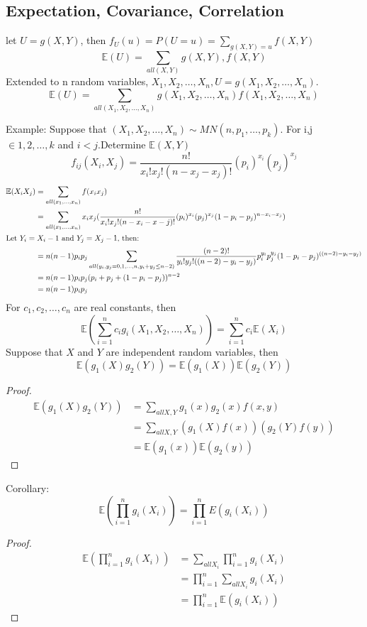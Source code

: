 \documentclass{article}
\newcommand{\E}{\mathbb{E}}
\begin{document}
\subsection{Expectation, Covariance, Correlation}
let $U = g(X,Y)$, then $f_U(u) = P(U = u) = \sum_{g(X,Y) = u} f(X, Y)$
$$\E(U) = \sum_{all(X,Y)}g(X,Y),f(X,Y)$$
Extended to n random variables, $X_1, X_2, \dotsc, X_n, U = g(X_1, X_2, \dotsc, X_n)$.
$$\E(U) = \sum_{all(X_1,X_2, \dotsc, X_n)}g(X_1, X_2, \dotsc, X_n)f(X_1, X_2, \dotsc, X_n)$$

\noindent Example: Suppose that $(X_1, X_2, \dotsc, X_n) \sim MN(n, p_1, \dotsc, p_k)$. For i,j $\in {1, 2, \dotsc, k}$ and $i<j$.Determine $\E(X,Y)$
$$f_{ij}(X_i, X_j) = \frac{n! }{x_i!x_j!(n - x_j - x_j)!} (p_i)^{x_i}(p_j)^{x_j}$$
\begin{align*}
    \E(X_iX_j) &= \sum_{all(x_1, \dotsc, x_n)}f(x_ix_j) \\
    &= \sum_{all (x_1, \dotsc, x_n)}x_ix_j(\frac{n!}{x_i!x_j!(n - x_i - x-j)!}(p_i)^{x_i}(p_j)^{x_j}(1-p_i-p_j)^{n - x_i - x_j}) \\
    \intertext{Let $Y_i = X_i - 1$ and $Y_j = X_j - 1$, then:}
    &= n(n-1)p_ip_j\sum_{all(y_i, y_j = 0, 1, \dotsc, n, y_i+y_j \le n - 2)}\frac{(n-2)!}{y_i!y_j!((n-2) - y_i - y_j)} p_i^{y_i}p_j^{y_j}(1 - p_i - p_j)^{((n-2) - y_i - y_j)}\\
    &= n(n-1)p_ip_j(p_i+p_j+(1-p_i-p_j))^{n-2}\\
    &= n(n-1)p_ip_j\\
\end{align*}
For $c_1, c_2, \dotsc, c_n$ are real constants, then
$$\E(\sum_{i=1}^{n}c_ig_i(X_1, X_2, \dotsc, X_n)) = \sum_{i=1}^{n}c_i\E(X_i)$$
\noindent Suppose that $X$ and $Y$ are independent random variables, then
$$\E(g_1(X)g_2(Y)) = \E(g_1(X))\E(g_2(Y))$$
\begin{proof}
    \begin{align*}
            \E(g_1(X)g_2(Y)) &= \sum_{all X,Y}g_1(x)g_2(x)f(x,y)\\
&= \sum_{all X, Y}(g_1(X)f(x))(g_2(Y)f(y))\\
&= \E(g_1(x))\E(g_2(y))
    \end{align*}
\end{proof}

\noindent Corollary:
$$\E(\prod_{i=1}^{n}g_i(X_i)) = \prod_{i=1}^{n}E(g_i(X_i))$$
\begin{proof}
    \begin{align*}
        \E(\prod_{i=1}^{n}g_i(X_i)) &= \sum_{all  X_i}\prod_{i=1}^{n}g_i(X_i)\\
        &= \prod_{i=1}^{n} \sum_{all X_i}g_i(X_i)\\
        &= \prod_{i=1}^{n} \E(g_i(X_i))
    \end{align*}
\end{proof}
\end{document}
